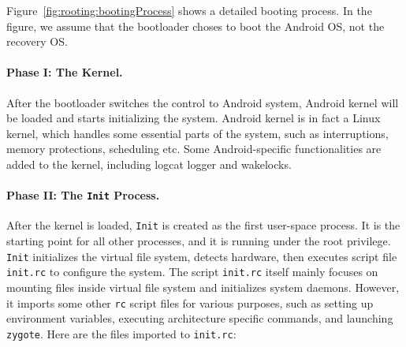 Figure~\ref{fig:rooting:bootingProcess} shows a detailed booting process. 
In the figure, we assume that the bootloader
choses to boot the Android OS, not the recovery OS.

\paragraph{Phase I: The Kernel.}
After the bootloader switches the control to Android system, Android kernel will be loaded and
starts initializing the system. Android kernel is in fact a Linux kernel, 
which handles some essential parts of the system, such as interruptions, memory protections,
scheduling etc. Some Android-specific functionalities are added to the kernel,
including logcat logger and wakelocks. 

\paragraph{Phase II: The \texttt{Init} Process.}
After the kernel is loaded, \texttt{Init} is created as the first user-space process. It is the starting
point for all other processes, and it is running under the root privilege. 
\texttt{Init} initializes the virtual file system, detects hardware, 
then executes script file \texttt{init.rc} to configure the system.
The script \texttt{init.rc} itself mainly focuses on mounting files inside virtual file system and
initializes system daemons. However, it imports some other \texttt{rc} script files for various
purposes, such as setting up environment variables, executing architecture specific commands,
and launching \texttt{zygote}. Here are the files imported to \texttt{init.rc}: 

